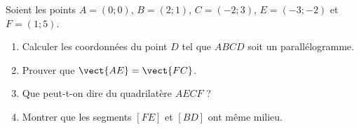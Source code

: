 
\begin{exercice}\label{exosmath-0064}

    Soient les points \( A=(0;0)\), \( B=(2;1)\), \( C=(-2;3)\), \( E=(-3;-2)\) et \( F=(1;5)\).
    \begin{enumerate}
        \item
            Calculer les coordonnées du point \( D\) tel que \( ABCD\) soit un parallélogramme.
        \item
            Prouver que \( \vect{ AE }=\vect{ FC }\).
        \item
            Que peut-t-on dire du quadrilatère \( AECF\) ?
        \item
            Montrer que les segments \( [FE]\) et \( [BD]\) ont même milieu.
    \end{enumerate}

\end{exercice}
